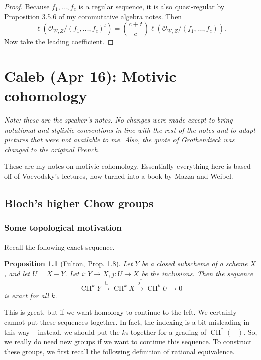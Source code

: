 \documentclass[leqno, openany]{memoir}
\newtheorem{prop}[thm]{Proposition}
\theoremstyle{definition}
\theoremstyle{remark}
\theoremstyle{plain}
\theoremstyle{definition}
\theoremstyle{remark}
\newcommand{\mc}[1]{\mathcal{#1}}
\DeclareMathOperator{\CH}{CH}
\begin{document}
\begin{proof}
    Because $f_1, \ldots, f_c$ is a regular sequence, it is also quasi-regular by Proposition 3.5.6 of my commutative algebra notes. Then 
    \[ \ell(\mc{O}_{W,Z} / {(f_1, \ldots, f_c)}^t) = \binom{c+t}{c} \ell(\mc{O}_{W,Z} / (f_1, \ldots, f_c)). \]
    Now take the leading coefficient.
\end{proof}

\chapter{Caleb (Apr 16): Motivic cohomology}%
\label{cha:caleb_apr_16_motivic_cohomology}

\textit{Note: these are the speaker's notes. No changes were made except to bring notational and stylistic conventions in line with the rest of the notes and to adapt pictures that were not available to me. Also, the quote of Grothendieck was changed to the original French.} 

These are my notes on motivic cohomology.  Essentially everything here is based off of Voevodsky's lectures, now turned into a book by Mazza and Weibel. 

\section{Bloch's higher Chow groups}

\subsection{Some topological motivation} 
Recall the following exact sequence. 

\begin{prop}
[Fulton, Prop. 1.8] Let $Y$ be a closed subscheme of a scheme $X$, and let $U=X-Y$.  Let $i:Y\rightarrow X, j:U\rightarrow X$ be the inclusions.  Then the sequence 
\[
\CH^kY\xrightarrow{i_*}\CH^kX\xrightarrow{j^*}\CH^kU\rightarrow 0
\]
is exact for all $k$.
\end{prop} 

This is great, but if we want homology to continue to the left.  We certainly cannot put these sequences together.  In fact, the indexing is a bit misleading in this way -- instead, we should put the $k$s together for a grading of $\CH^*(-)$.  So, we really do need new groups if we want to continue this sequence.  To construct these groups, we first recall the following definition of rational equivalence. 
\end{document}
